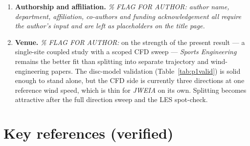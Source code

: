 \documentclass[11pt,letterpaper]{article}
\begin{document}
\begin{enumerate}[leftmargin=*,itemsep=3pt]
    \textbf{What is actually true is milder, and it restores the original default.} The
    short range is release geometry: \texttt{hammer()} rolls the disc $+80^\circ$, so the
    lift vector is nearly horizontal and does little work against gravity. Lift is
    mis-directed, not absent. Sweeping roll $0^\circ \to 90^\circ$ moves the range
    monotonically 2.1 m $\to$ 12.4 m. Note this also corrects the previous default's
    \emph{stated ground}: the hammer as parameterised does \emph{not} spend most of its
    flight outside the $-10^\circ$ to $+30^\circ$ band --- it never leaves it. It is
    exploratory because the release parameters are unvalidated (a real hammer leaves the
    hand at roughly 18--21 m\,s$^{-1}$, not 11, and the $+80^\circ$ roll is a guess), not
    because the coefficients are extrapolated. \emph{\% FLAG FOR AUTHOR: extending the
    coefficient table past stall is therefore \textbf{not} the fix --- the table is never
    exceeded. If the hammer is to carry weight, the release parameterisation is what needs
    measuring. Dropping it remains admissible and costs nothing, since the backhand and
    forehand results do not depend on it.}

  \item \textbf{Authorship and affiliation.}
    \emph{\% FLAG FOR AUTHOR: author name, department, affiliation, co-authors
    and funding acknowledgement all require the author's input and are left as
    placeholders on the title page.}

  \item \textbf{Venue.} \emph{\% FLAG FOR AUTHOR:} on the strength of the
    present result --- a single-site coupled study with a scoped CFD sweep ---
    \emph{Sports Engineering} remains the better fit than splitting into
    separate trajectory and wind-engineering papers. The disc-model validation
    (Table~\ref{tab:p1valid}) is solid enough to stand alone, but the CFD side
    is currently three directions at one reference wind speed, which is thin
    for \emph{JWEIA} on its own. Splitting becomes attractive after the full
    direction sweep and the LES spot-check.
\end{enumerate}

\section*{Key references (verified)}
\end{document}
